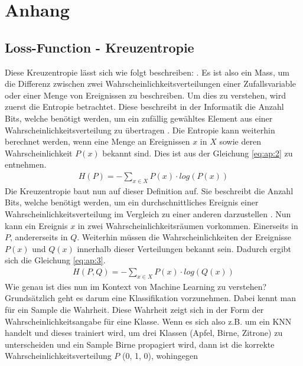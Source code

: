 \chapter{Anhang}
\section{Loss-Function - Kreuzentropie}\label{anhang:kreuzentropie}
Diese Kreuzentropie lässt sich wie folgt beschreiben:  \cite{machinelearningmastery:1:crossEntropy}.
Es ist also ein Mass, um die Differenz zwischen zwei Wahrscheinlichkeitsverteilungen einer Zufallsvariable oder einer
Menge von Ereignissen zu beschreiben. Um dies zu verstehen, wird zuerst die Entropie betrachtet. Diese beschreibt in der
Informatik die Anzahl Bits, welche benötigt werden, um ein zufällig gewähltes Element aus einer Wahrscheinlichkeitsverteilung
zu übertragen \cite{machinelearningmastery:1:crossEntropy}. Die Entropie kann weiterhin berechnet werden, wenn eine Menge
an Ereignissen $x$ in $X$ sowie deren Wahrscheinlichkeit $P(x)$ bekannt sind. Dies ist aus der Gleichung \ref{eq:ap:2} zu entnehmen.
\begin{align}
    H(P) = - \sum_{x \in X} P(x) \cdot log(P(x)) \label{eq:ap:2}
\end{align}
Die Kreuzentropie baut nun auf dieser Definition auf. Sie beschreibt die Anzahl Bits, welche benötigt werden, um ein
durchschnittliches Ereignis einer Wahrscheinlichkeitsverteilung im Vergleich zu einer anderen darzustellen \cite{machinelearningmastery:1:crossEntropy}.
Nun kann ein Ereignis $x$ in zwei Wahrscheinlichkeitsräumen vorkommen. Einerseits in $P$, andererseits in $Q$. Weiterhin
müssen die Wahrscheinlichkeiten der Ereignisse $P(x)$ und $Q(x)$ innerhalb dieser Verteilungen bekannt sein. Dadurch ergibt
sich die Gleichung \ref{eq:ap:3}.
\begin{align}
    H(P,Q) = - \sum_{x \in X} P(x) \cdot log(Q(x)) \label{eq:ap:3}
\end{align}
Wie genau ist dies nun im Kontext von Machine Learning zu verstehen? Grundsätzlich geht es darum eine Klassifikation vorzunehmen.
Dabei kennt man für ein Sample die Wahrheit. Diese Wahrheit zeigt sich in der Form der Wahrscheinlichkeitsangabe für eine Klasse.
Wenn es sich also z.B. um ein KNN handelt und dieses trainiert wird, um drei Klassen (Apfel, Birne, Zitrone) zu unterscheiden und
ein Sample \glqq Birne\grqq{} propagiert wird, dann ist die korrekte Wahrscheinlichkeitsverteilung $P$ (0, 1, 0), wohingegen
